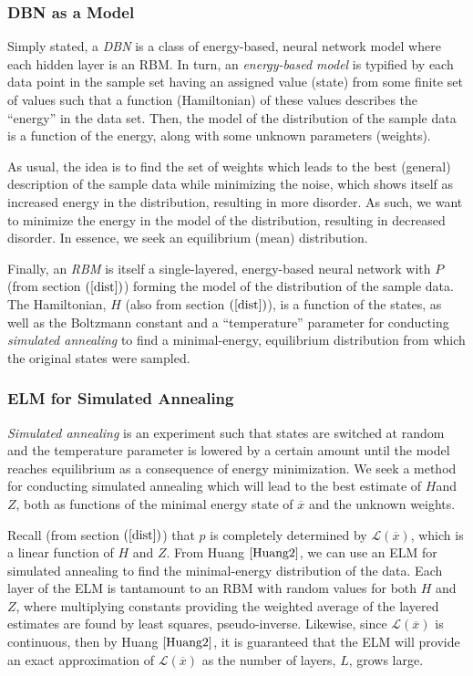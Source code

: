 \documentclass[11pt]{imsart}
\begin{document}
\subsubsection{DBN as a Model}

Simply stated, a \textit{DBN} is a class of energy-based, neural network model where each hidden layer is an RBM.  In turn, an \textit{energy-based model} is typified by each data point in the sample set having an assigned value (state) from some finite set of values such that a function (Hamiltonian) of these values describes the “energy” in the data set.  Then, the model of the distribution of the sample data is a function of the energy, along with some unknown parameters (weights).

As usual, the idea is to find the set of weights which leads to the best (general) description of the sample data while minimizing the noise, which shows itself as increased energy in the distribution, resulting in more disorder.  As such, we want to minimize the energy in the model of the distribution, resulting in decreased disorder.  In essence, we seek an equilibrium (mean) distribution.

Finally, an \textit{RBM} is itself a single-layered, energy-based neural network with $P$ (from section $(\ref{dist})$) forming the model of the distribution of the sample data.  The Hamiltonian, $H$ (also from section $(\ref{dist})$), is a function of the states, as well as the Boltzmann constant and a “temperature” parameter for conducting \textit{simulated annealing} to find a minimal-energy, equilibrium distribution from which the original states were sampled.

\subsubsection{ELM for Simulated Annealing}

\textit{Simulated annealing} is an experiment such that states are switched at random and the temperature parameter is lowered by a certain amount until the model reaches equilibrium as a consequence of energy minimization.  We seek a method for conducting simulated annealing which will lead to the best estimate of $H$and $Z$, both as functions of the minimal energy state of $\overline{x}$ and the unknown weights.

Recall (from section $(\ref{dist})$) that $p$ is completely determined by $\mathcal{L}(\overline{x})$, which is a linear function of $H$ and $Z$.  From Huang $\cite{Huang2}$, we can use an ELM for simulated annealing to find the minimal-energy distribution of the data.  Each layer of the ELM is tantamount to an RBM with random values for both $H$ and $Z$, where multiplying constants providing the weighted average of the layered estimates are found by least squares, pseudo-inverse.  Likewise, since $\mathcal{L}(\overline{x})$ is continuous, then by Huang $\cite[Theorems\ (2.1-2.2)]{Huang2}$, it is guaranteed that the ELM will provide an exact approximation of $\mathcal{L}(\overline{x})$ as the number of layers, $L$, grows large.
\end{document}
